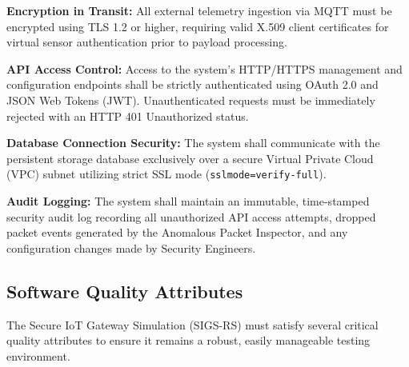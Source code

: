 \documentclass[12pt,letterpaper]{article}
\begin{document}
\vspace{0.08in}
\noindent\hspace*{0.94in} \textbf{Encryption in Transit:} All external telemetry ingestion via MQTT must be encrypted using TLS 1.2 or higher, requiring valid X.509 client certificates for virtual sensor authentication prior to payload processing.\par
\vspace{0.04in}
\noindent\hspace*{0.94in} \textbf{API Access Control:} Access to the system's HTTP/HTTPS management and configuration endpoints shall be strictly authenticated using OAuth 2.0 and JSON Web Tokens (JWT). Unauthenticated requests must be immediately rejected with an HTTP 401 Unauthorized status.\par
\vspace{0.04in}
\noindent\hspace*{0.94in} \textbf{Database Connection Security:} The system shall communicate with the persistent storage database exclusively over a secure Virtual Private Cloud (VPC) subnet utilizing strict SSL mode (\texttt{sslmode=verify-full}).\par
\vspace{0.04in}
\noindent\hspace*{0.94in} \textbf{Audit Logging:} The system shall maintain an immutable, time-stamped security audit log recording all unauthorized API access attempts, dropped packet events generated by the Anomalous Packet Inspector, and any configuration changes made by Security Engineers.\par
\subsection{Software Quality Attributes}
The Secure IoT Gateway Simulation (SIGS-RS) must satisfy several critical quality attributes to ensure it remains a robust, easily manageable testing environment.
\end{document}
